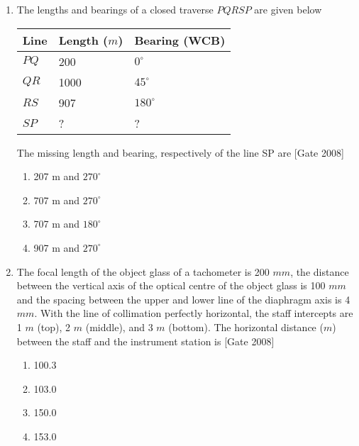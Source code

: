 \documentclass[journal]{IEEEtran}
\begin{document}
\begin{enumerate}
\begin{multicols}{4}
	\begin{enumerate}
		\item 10000
		\item 6561
		\item 1000
		\item 656
	\end{enumerate}
\end{multicols}	
	\item The lengths and bearings of a closed traverse $PQRSP$ are given below 
		\begin{table}[h]
	\centering
\begin{tabular}{|l|l|l|}
	\hline
	 Line & Length ($m$)   &  Bearing (WCB)  \\

	\hline
	$PQ$ & 200 & $0^{\circ}$   \\
	\hline
	$QR$ & 1000  &$45^{\circ}$  \\
	\hline
	$RS$ & 907 & $180^{\circ}$  \\
	\hline
	 $SP$  & ?  & ?  \\
	\hline
	



\end{tabular} 
\end{table}
		
The missing length and bearing, respectively of the line SP are  \hfill [Gate 2008]
\begin{multicols}{2}
	\begin{enumerate}
		\item 207 m and $270^{\circ}$
		\item 707 m and $270^{\circ}$
		\item 707 m and $180^{\circ}$
		\item 907 m and $270^{\circ}$
	\end{enumerate}
\end{multicols}	
 \item The focal length of the object glass of a tachometer is 200 $mm$, the distance between the vertical axis of the optical centre of the object glass is 100 $mm$ and the spacing between the upper and lower line of the diaphragm axis is 4 $mm$. With the line of collimation perfectly horizontal, the staff intercepts are 1 $m$ (top), 2 $m$ (middle), and 3 $m$ (bottom). The horizontal distance ($m$) between the staff and the instrument station is  \hfill [Gate 2008]
	 \begin{multicols}{4}
	\begin{enumerate}
		\item 100.3
		\item 103.0
		\item 150.0
		\item 153.0
	\end{enumerate}
\end{multicols}	


		

\end{enumerate}
\end{document}
